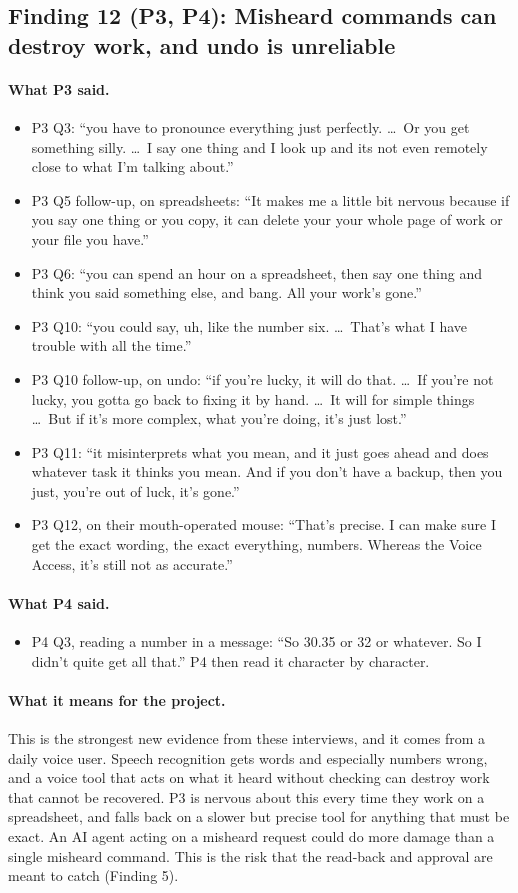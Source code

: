 \documentclass[12pt, titlepage]{article}
\newcommand{\saidthree}{\paragraph{What P3 said.}}
\newcommand{\saidfour}{\paragraph{What P4 said.}}
\newcommand{\means}{\paragraph{What it means for the project.}}
\begin{document}
\subsection{Finding 12 (P3, P4): Misheard commands can destroy work, and undo is unreliable}

\saidthree
\begin{itemize}
    \item P3 Q3: ``you have to pronounce everything just perfectly. \ldots\ Or you get something silly. \ldots\ I say one thing and I look up and its not even remotely close to what I'm talking about.''
    \item P3 Q5 follow-up, on spreadsheets: ``It makes me a little bit nervous because if you say one thing or you copy, it can delete your your whole page of work or your file you have.''
    \item P3 Q6: ``you can spend an hour on a spreadsheet, then say one thing and think you said something else, and bang. All your work's gone.''
    \item P3 Q10: ``you could say, uh, like the number six. \ldots\ That's what I have trouble with all the time.''
    \item P3 Q10 follow-up, on undo: ``if you're lucky, it will do that. \ldots\ If you're not lucky, you gotta go back to fixing it by hand. \ldots\ It will for simple things \ldots\ But if it's more complex, what you're doing, it's just lost.''
    \item P3 Q11: ``it misinterprets what you mean, and it just goes ahead and does whatever task it thinks you mean. And if you don't have a backup, then you just, you're out of luck, it's gone.''
    \item P3 Q12, on their mouth-operated mouse: ``That's precise. I can make sure I get the exact wording, the exact everything, numbers. Whereas the Voice Access, it's still not as accurate.''
\end{itemize}

\saidfour
\begin{itemize}
    \item P4 Q3, reading a number in a message: ``So 30.35 or 32 or whatever. So I didn't quite get all that.'' P4 then read it character by character.
\end{itemize}

\means
This is the strongest new evidence from these interviews, and it comes from a daily voice user. Speech recognition gets words and especially numbers wrong, and a voice tool that acts on what it heard without checking can destroy work that cannot be recovered. P3 is nervous about this every time they work on a spreadsheet, and falls back on a slower but precise tool for anything that must be exact. An AI agent acting on a misheard request could do more damage than a single misheard command. This is the risk that the read-back and approval are meant to catch (Finding 5).
\end{document}
